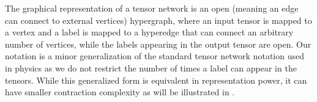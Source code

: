 \documentclass[review, onefignum, onetabnum]{siamart190516}
\begin{document}
The graphical representation of a tensor network is an open (meaning an edge can connect to external vertices) hypergraph, where an input tensor is mapped to a vertex and a label is mapped to a hyperedge that can connect an arbitrary number of vertices, while the labels appearing in the output tensor are open.
Our notation is a minor generalization of the standard tensor network notation used in physics as we do not restrict the number of times a label can appear in the tensors. 
While this generalized form is equivalent in representation power, it can have smaller contraction complexity as will be illustrated in .
\end{document}
